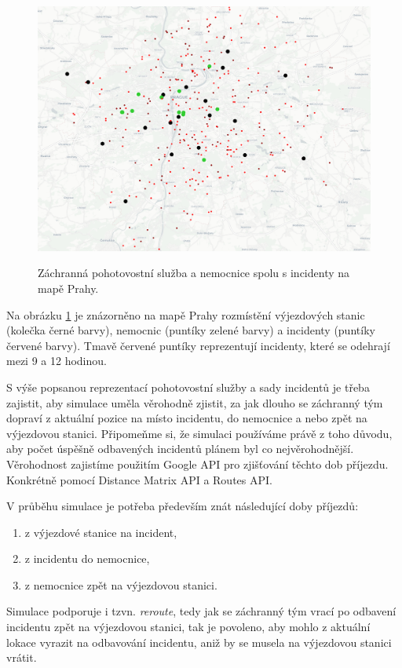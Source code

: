 \begin{figure}[H]
  \caption{Záchranná pohotovostní služba a nemocnice spolu s incidenty na mapě Prahy.}
  \includegraphics[width=\textwidth]{img/prague_monday_420.png}
  \centering
  \label{img:prague}
\end{figure}

Na obrázku \ref{img:prague} je znázorněno na mapě Prahy rozmístění výjezdových stanic (kolečka černé barvy), nemocnic (puntíky zelené barvy) a incidenty (puntíky červené barvy).
Tmavě červené puntíky reprezentují incidenty, které se odehrají mezi 9 a 12 hodinou.

S výše popsanou reprezentací pohotovostní služby a sady incidentů je třeba zajistit, aby simulace uměla věrohodně zjistit, za jak dlouho se záchranný tým dopraví z aktuální pozice
na místo incidentu, do nemocnice a nebo zpět na výjezdovou stanici. Připomeňme si, že simulaci používáme právě z toho důvodu, aby počet úspěšně odbavených incidentů plánem byl co nejvěrohodnější.
Věrohodnost zajistíme použitím Google API pro zjišťování těchto dob příjezdu. Konkrétně pomocí Distance Matrix API a Routes API.

V průběhu simulace je potřeba především znát následující doby příjezdů:
\begin{enumerate}
  \item z výjezdové stanice na incident,
  \item z incidentu do nemocnice,
  \item z nemocnice zpět na výjezdovou stanici.
\end{enumerate}

Simulace podporuje i tzvn. \textit{reroute}, tedy jak se záchranný tým vrací po odbavení incidentu zpět na výjezdovou stanici,
tak je povoleno, aby mohlo z aktuální lokace vyrazit na odbavování incidentu, aniž by se musela na výjezdovou stanici vrátit.

